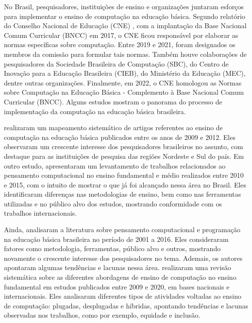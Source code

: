 No Brasil, pesquisadores, instituições de ensino e organizações juntaram esforços para implementar o ensino de computação na educação básica. Segundo relatório do Conselho Nacional de Educação (CNE) \citep{brasil2021normas}, com a implantação da Base Nacional Comum Curricular (BNCC) em 2017, o CNE ficou responsável por elaborar as normas específicas sobre computação. Entre 2019 e 2021, foram designados os membros da comissão para formular tais normas. Também houve colaborações de pesquisadores da Sociedade Brasileira de Computação (SBC), do Centro de Inovação para a Educação Brasileira (CIEB), do Ministério da Educação (MEC), dentre outras organizações. Finalmente, em 2022, o CNE homologou as Normas sobre Computação na Educação Básica - Complemento à Base Nacional Comum Curricular (BNCC). Alguns estudos mostram o panorama do processo de implementação da computação na educação básica brasileira.

\citet{defranca2013ensino} realizaram um mapeamento sistemático de artigos referentes ao ensino de computação na educação básica publicados entre os anos de 2009 e 2012. Eles observaram um crescente interesse dos pesquisadores brasileiros no assunto, com destaque para as instituições de pesquisa das regiões Nordeste e Sul do país. Em outro estudo, \citet{bordini2016computaccao} apresentaram um levantamento de trabalhos relacionados ao pensamento computacional no ensino fundamental e médio realizados entre 2010 e 2015, com o intuito de mostrar o que já foi alcançado nessa área no Brasil. Eles identificaram diferenças nas metodologias de ensino, bem como nas ferramentas utilizadas e no público alvo dos estudos, mostrando conformidade com os trabalhos internacionais.

Ainda, \citet{santos2018mapping} analisaram a literatura sobre pensamento computacional e programação na educação básica brasileira no período de 2001 a 2016.  Eles consideraram fatores como metodologia, ferramentas, público alvo e outros, mostrando novamente o crescente interesse dos pesquisadores no tema. Ademais, os autores apontaram algumas tendências e lacunas nessa área. \citet{dossantos2021ensinar} realizaram uma revisão sistemática sobre as diferentes abordagens de ensino de computação no ensino fundamental em estudos publicados entre 2009 e 2020, em bases nacionais e internacionais. Eles analisaram diferentes tipos de atividades voltadas ao ensino de computação: plugadas, desplugadas e híbridas, apontando tendências e lacunas observadas nos trabalhos, como por exemplo, equidade e inclusão.

